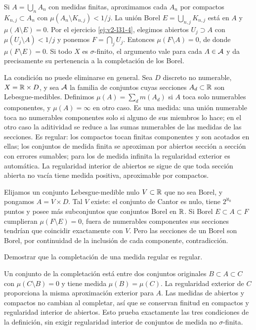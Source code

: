 \begin{solucion}
Si $A=\bigcup_nA_n$ con medidas finitas, aproximamos cada $A_n$ por compactos $K_{n,j}\subset A_n$ con $\mu(A_n\setminus K_{n,j})<1/j$. La unión Borel $E=\bigcup_{n,j}K_{n,j}$ está en $A$ y $\mu(A\setminus E)=0$. Por el ejercicio \ref{ej:v2-l31-4}, elegimos abiertos $U_j\supset A$ con $\mu(U_j\setminus A)<1/j$ y ponemos $F=\bigcap_jU_j$. Entonces $\mu(F\setminus A)=0$, de donde $\mu(F\setminus E)=0$. Si todo $X$ es $\sigma$-finito, el argumento vale para cada $A\in\mathcal A$ y da precisamente su pertenencia a la completación de los Borel.

La condición no puede eliminarse en general. Sea $D$ discreto no numerable, $X=\mathbb R\times D$, y sea $\mathcal A$ la familia de conjuntos cuyas secciones $A_d\subset\mathbb R$ son Lebesgue-medibles. Definimos $\mu(A)=\sum_d m(A_d)$ si $A$ toca solo numerables componentes, y $\mu(A)=\infty$ en otro caso. Es una medida: una unión numerable toca no numerables componentes solo si alguno de sus miembros lo hace; en el otro caso la aditividad se reduce a las sumas numerables de las medidas de las secciones. Es regular: los compactos tocan finitas componentes y son acotados en ellas; los conjuntos de medida finita se aproximan por abiertos sección a sección con errores sumables; para los de medida infinita la regularidad exterior es automática. La regularidad interior de abiertos se sigue de que toda sección abierta no vacía tiene medida positiva, aproximable por compactos.

Elijamos un conjunto Lebesgue-medible nulo $V\subset\mathbb R$ que no sea Borel, y pongamos $A=V\times D$. Tal $V$ existe: el conjunto de Cantor es nulo, tiene $2^{\aleph_0}$ puntos y posee más subconjuntos que conjuntos Borel en $\mathbb R$. Si Borel $E\subset A\subset F$ cumplieran $\mu(F\setminus E)=0$, fuera de numerables componentes sus secciones tendrían que coincidir exactamente con $V$. Pero las secciones de un Borel son Borel, por continuidad de la inclusión de cada componente, contradicción.
\end{solucion}

\begin{ejercicio}\label{ej:v2-l31-6}
Demostrar que la completación de una medida regular es regular.
\end{ejercicio}
\begin{solucion}
Un conjunto de la completación está entre dos conjuntos originales $B\subset A\subset C$ con $\mu(C\setminus B)=0$ y tiene medida $\mu(B)=\mu(C)$. La regularidad exterior de $C$ proporciona la misma aproximación exterior para $A$. Las medidas de abiertos y compactos no cambian al completar, así que se conservan finitud en compactos y regularidad interior de abiertos. Esto prueba exactamente las tres condiciones de la definición, sin exigir regularidad interior de conjuntos de medida no $\sigma$-finita.
\end{solucion}

